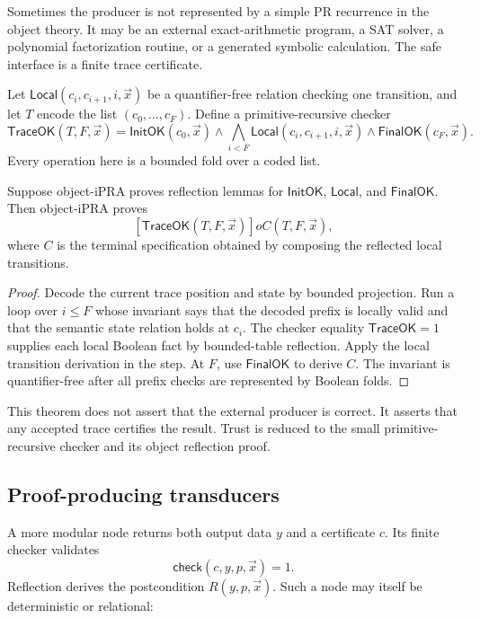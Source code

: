 Sometimes the producer is not represented by a simple PR recurrence in the object theory.  It may be an external exact-arithmetic program, a SAT solver, a polynomial factorization routine, or a generated symbolic calculation.  The safe interface is a finite trace certificate.

Let \(\mathsf{Local}(c_i,c_{i+1},i,\vec{x})\) be a quantifier-free relation checking one transition, and let \(T\) encode the list \((c_0,\ldots,c_F)\).  Define a primitive-recursive checker
\[
 \mathsf{TraceOK}(T,F,\vec{x})=
 \mathsf{InitOK}(c_0,\vec{x})\wedge
 \bigwedge_{i<F}\mathsf{Local}(c_i,c_{i+1},i,\vec{x})
 \wedge \mathsf{FinalOK}(c_F,\vec{x}).
\]
Every operation here is a bounded fold over a coded list.

\begin{theorem}
\label{thm:trace-reflection}
Suppose object-iPRA proves reflection lemmas for \(\mathsf{InitOK}\), \(\mathsf{Local}\), and \(\mathsf{FinalOK}\).  Then object-iPRA proves
\[
 [\mathsf{TraceOK}(T,F,\vec{x})]	o C(T,F,\vec{x}),
\]
where \(C\) is the terminal specification obtained by composing the reflected local transitions.
\end{theorem}

\begin{proof}
Decode the current trace position and state by bounded projection.  Run a loop over \(i\le F\) whose invariant says that the decoded prefix is locally valid and that the semantic state relation holds at \(c_i\).  The checker equality \(\mathsf{TraceOK}=1\) supplies each local Boolean fact by bounded-table reflection.  Apply the local transition derivation in the step.  At \(F\), use \(\mathsf{FinalOK}\) to derive \(C\).  The invariant is quantifier-free after all prefix checks are represented by Boolean folds.
\end{proof}

This theorem does not assert that the external producer is correct.  It asserts that any accepted trace certifies the result.  Trust is reduced to the small primitive-recursive checker and its object reflection proof.

\subsection{Proof-producing transducers}

A more modular node returns both output data \(y\) and a certificate \(c\).  Its finite checker validates
\[
 \mathsf{check}(c,y,p,\vec{x})=1.
\]
Reflection derives the postcondition \(R(y,p,\vec{x})\).  Such a node may itself be deterministic or relational:

